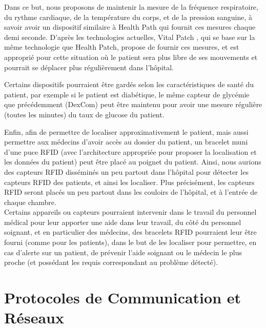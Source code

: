 \documentclass{article}
\begin{document}
Dans ce but, nous proposons de maintenir la mesure de la fréquence respiratoire, du rythme cardiaque, de la température du corps, et de la pression sanguine, à savoir avoir un dispositif similaire à Health Path qui fournit ces mesures chaque demi seconde. D’après les technologies actuelles, Vital Patch \cite{VitalPatch}, qui se base sur la même technologie que Health Patch, propose de fournir ces mesures, et est approprié pour cette situation où le patient sera plus libre de ses mouvements et pourrait se déplacer plus régulièrement dans l’hôpital.

Certains dispositifs pourraient être gardés selon les caractéristiques de santé du patient, par exemple si le patient est diabétique, le même capteur de glycémie que précédemment (DexCom) peut être maintenu pour avoir une mesure régulière (toutes les minutes) du taux de glucose du patient.

Enfin, afin de permettre de localiser approximativement le patient, mais aussi permettre aux médecins d’avoir accès au dossier du patient, un bracelet muni d’une puce RFID (avec l’architecture appropriée pour proposer la localisation et les données du patient) peut être placé au poignet du patient. Ainsi, nous aurions des capteurs RFID disséminés un peu partout dans l’hôpital pour détecter les capteurs RFID des patients, et ainsi les localiser. Plus précisément, les capteurs RFID seront placés un peu partout dans les couloirs de l’hôpital, et à l’entrée de chaque chambre.
\\

Certains appareils ou capteurs pourraient intervenir dans le travail du personnel médical pour leur apporter une aide dans leur travail, du côté du personnel soignant, et en particulier des médecins, des bracelets RFID \cite{BraceletRFID} pourraient leur être fourni (comme pour les patients), dans le but de les localiser pour permettre, en cas d’alerte sur un patient, de prévenir l’aide soignant ou le médecin le plus proche (et possédant les requis correspondant au problème détecté).

\section {Protocoles de Communication et Réseaux}
\end{document}
